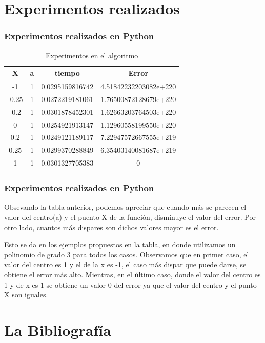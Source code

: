 \documentclass{beamer}
\begin{document}
\section{Experimentos realizados}

\begin{frame}
\frametitle{Experimentos realizados en \textsf{Python}}
\begin{table}{}
 \begin{center}
  \begin{tabular}{|c|c|c|c|}
   \hline
   X     &a& tiempo            & Error \\ \hline
   -1    &1&0.0295159816742    & 4.51842232203082e+220 \\ \hline
   -0.25 &1&0.0272219181061    & 1.76500872128679e+220 \\ \hline
   -0.2  &1&0.0301878452301    & 1.62663203764503e+220 \\ \hline     
   0     &1&0.0254921913147    & 1.12960558199550e+220 \\ \hline
   0.2   &1&0.0249121189117    & 7.22947572667555e+219 \\ \hline
   0.25  &1&0.0299370288849    & 6.35403140081687e+219 \\ \hline
   1     &1&0.0301327705383    & 0 \\ \hline
\end{tabular}
\end{center}
\caption{Experimentos en el algoritmo}
\label{tab}
\end{table}
\end{frame}
\begin{frame}
\frametitle{Experimentos realizados en \textsf{Python}}
Obsevando la tabla anterior, podemos apreciar que cuando más se parecen el valor del centro(a) y el puento X de la función, disminuye el valor del error. Por otro lado, cuantos más dispares son dichos valores mayor es el error.\par 

Esto se da en los ejemplos propuestos en la tabla, en donde utilizamos un polinomio de grado 3 para todos los casos. Observamos que en primer caso, el valor del centro es 1 y el de la x es -1, el caso más dispar que puede darse, se obtiene el error más alto. Mientras, en el último caso, donde el valor del centro es 1 y de x es 1 se obtiene un valor 0 del error ya que el valor del centro y el punto X son iguales.
\end{frame}



\section{La Bibliografía}
\end{document}
